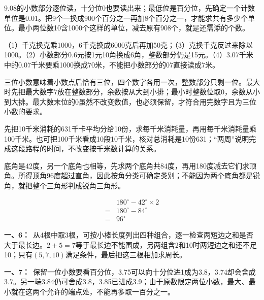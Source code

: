 \documentclass[multi=snippet,border=0pt]{standalone}
\newenvironment{snippet}[3]{\begin{minipage}{#1bp}\color{answerred}\fontsize{#2}{#3}\selectfont\raggedright}{\end{minipage}}
\begin{document}
\begin{snippet}{505}{11.5}{14}9.08的小数部分逐位读，十分位0也要读出来；最低位是百分位，先确定一个计数单位是0.01。把9个一换成900个百分之一再加8个百分之一，才能求共有多少个单位。最小两位数10含1000个这样的单位，减去原有908个，就是还需添的个数。\end{snippet}
\begin{snippet}{505}{11.5}{14}（1）千克换克乘1000，6千克换成6000克后再加50克；（3）克换千克反过来除以1000。（2）小数部分0.6元按1元10角换成6角，整数部分仍是15元。（4）3.07千米中的0.07千米要乘1000换成70米，不能把小数部分的07直接读成7米。\end{snippet}
\begin{snippet}{505}{11.5}{14}三位小数意味着小数点后恰有三位，四个数字各用一次，整数部分只剩一位。最大时先把最大数字7放在整数部分，余数按从大到小排；最小时整数位取0，余数从小到大排。最大数末位的0虽然不改变数值，也必须保留，才符合用完数字且为三位小数的要求。\end{snippet}
\begin{snippet}{505}{11.5}{14}先把10千米消耗的631千卡平均分给10份，求每千米消耗量，再用每千米消耗量乘100千米。也可把100千米看成10段10千米，核对总消耗是10份631；“两周”说明完成这段路程的时间，不改变按千米数计算的关系。\end{snippet}
\begin{snippet}{505}{11.5}{14}底角是42度，另一个底角也相等，先求两个底角共84度，再用180度减去它们求顶角。所得顶角96度超过直角，因此按角分类可确定类别；不能因为两个底角都是锐角，就把整个三角形判成锐角三角形。\par \[\begin{aligned}&180^\circ-42^\circ\times2\\={}&180^\circ-84^\circ\\={}&96^\circ\end{aligned}\]\end{snippet}
\begin{snippet}{505}{11.5}{14}\textbf{一、6：}\ 从4根中取3根，可按小棒长度列出四种组合，逐一检查两短边之和是否大于最长边。\(2+5=7\)等于最长边不能围成，另两组含2和10时两短边之和还不足10；只有\((5,7,10)\)满足条件，最后把这三根相加求周长。\end{snippet}
\begin{snippet}{505}{11.5}{14}\textbf{一、7：}\ 保留一位小数要看百分位，3.75可以向十分位进1成为3.8，3.74却会舍成3.7。另一端3.84仍可舍成3.8，3.85已进成3.9；由于原数限定两位小数，最大、最小就在这两个允许的端点处，不能再多取一百分之一。\end{snippet}
\end{document}
